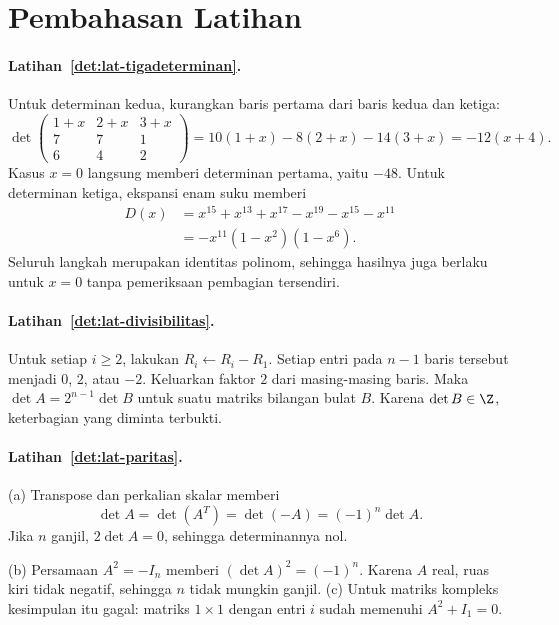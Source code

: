 \ifpembahasan
      \clearpage
      \section{Pembahasan Latihan}
      \label{det:pembahasan}

      \paragraph{Latihan~\ref{det:lat-tigadeterminan}.}
      Untuk determinan kedua, kurangkan baris pertama dari baris kedua
      dan ketiga:
      \[
            \det\begin{pmatrix}
                  1+x & 2+x & 3+x \\7&7&1\\6&4&2
            \end{pmatrix}
            =10(1+x)-8(2+x)-14(3+x)=-12(x+4).
      \]
      Kasus $x=0$ langsung memberi determinan pertama, yaitu $-48$.
      Untuk determinan ketiga, ekspansi enam suku memberi
      \begin{align*}
            D(x) & =x^{15}+x^{13}+x^{17}-x^{19}-x^{15}-x^{11} \\
                 & =-x^{11}(1-x^2)(1-x^6).
      \end{align*}
      Seluruh langkah merupakan identitas polinom, sehingga hasilnya juga
      berlaku untuk $x=0$ tanpa pemeriksaan pembagian tersendiri.

      \paragraph{Latihan~\ref{det:lat-divisibilitas}.}
      Untuk setiap $i\ge2$, lakukan $R_i\leftarrow R_i-R_1$.
      Setiap entri pada $n-1$ baris tersebut menjadi $0$, $2$, atau $-2$.
      Keluarkan faktor $2$ dari masing-masing baris. Maka
      $\det A=2^{n-1}\det B$ untuk suatu matriks bilangan bulat $B$.
      Karena $\det B\in\Z$, keterbagian yang diminta terbukti.

      \paragraph{Latihan~\ref{det:lat-paritas}.}
      (a) Transpose dan perkalian skalar memberi
      \[
            \det A=\det(A^T)=\det(-A)=(-1)^n\det A.
      \]
      Jika $n$ ganjil, $2\det A=0$, sehingga determinannya nol.

      (b) Persamaan $A^2=-I_n$ memberi $(\det A)^2=(-1)^n$.
      Karena $A$ real, ruas kiri tidak negatif, sehingga $n$ tidak mungkin
      ganjil. (c) Untuk matriks kompleks kesimpulan itu gagal: matriks
      $1\times1$ dengan entri $i$ sudah memenuhi $A^2+I_1=0$.

